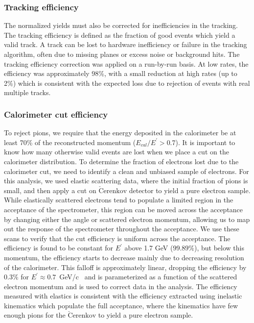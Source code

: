 \subsubsection{Tracking efficiency}\label{track.sssec}

The normalized yields must also be corrected for inefficiencies in the
tracking. The tracking efficiency is defined as the fraction of good events
which yield a valid track. A track can be lost to hardware inefficiency or
failure in the tracking algorithm, often due to missing planes or excess
noise or background hits. The tracking efficiency correction was applied on a
run-by-run basis. At low rates, the efficiency was approximately 98\%, with a
small reduction at high rates (up to 2\%) which is consistent with the
expected loss due to rejection of events with real multiple tracks.


\subsubsection{Calorimeter cut efficiency}\label{caloricut.sssec}

To reject pions, we require that the energy deposited in the calorimeter be at
least 70\% of the reconstructed momentum ($E_{cal}/E^{'}$$>$0.7).  It is
important to know how many otherwise valid events are lost when we place a cut
on the calorimeter distribution. To determine the fraction of electrons lost
due to the calorimeter cut, we need to identify a clean and unbiased sample of
electrons.  For this analysis, we used elastic scattering data, where the
initial fraction of pions is small, and then apply a cut on
$\mathrm{\check{C}erenkov}$ detector to yield a pure electron sample. While
elastically scattered electrons tend to populate a limited region in the
acceptance of the spectrometer, this region can be moved across the acceptance
by changing either the angle or scattered electron momentum, allowing us to
map out the response of the spectrometer throughout the acceptance. We use
these scans to verify that the cut efficiency is uniform across the
acceptance. The efficiency is found to be constant for $E^\prime$ above 1.7
GeV ($99.89\%$), but below this momentum, the efficiency starts to decrease
mainly due to decreasing resolution of the calorimeter. This falloff is
approximately linear, dropping the efficiency by 0.3\% for $E^\prime \approx
0.7$~GeV/c~\cite{aji_thesis} and is parameterized as a function of the
scattered electron momentum and is used to correct data in the analysis. The
efficiency measured with elastics is consistent with the efficiency extracted
using inelastic kinematics which populate the full acceptance, where the
kinematics have few enough pions for the $\mathrm{\check{C}erenkov}$ to yield
a pure electron sample.


